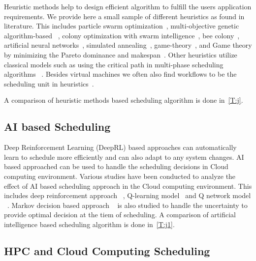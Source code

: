 \documentclass[final,5p,times,twocolumn]{elsarticle}
\begin{document}
Heuristic methods help to design efficient algorithm to fulfill the
users application requirements. We provide here a small sample of
different heuristics as found in literature. This includes particle
swarm optimization~\cite{pandey2010particle}, multi-objective genetic
algorithm-based ~\cite{mezmaz2011parallel,gkasior2016metaheuristic},
colony optimization with swarm intelligence~\cite{mateos2013aco}, bee
colony~\cite{ld2013honey}, artificial neural
networks~\cite{kousiouris2011effects}, simulated
annealing~\cite{torabzadeh2010cloud},
game-theory~\cite{gkasior2016metaheuristic}, and Game theory by
minimizing the Pareto dominance and makespan~\cite{su2013cost}.  Other
heuristics utilize classical models such as using the critical path in
multi-phase scheduling algorithms ~\cite
{abrishami2013deadline}. Besides virtual machines we often also find
workflows to be the scheduling unit in
heuristics~\cite{bousselmi2016qos}.

A comparison of heuristic methods based scheduling
algorithm is done in~\ref{T:j}.






\subsection{AI based Scheduling}\label{sec:AI}

\color{red}

Deep Reinforcement Learning (DeepRL) based approaches can
automatically learn to schedule more efficiently and can also adapt to
any system changes. AI based approached can be used to handle the
scheduling decisions in Cloud computing environment. Various studies
have been conducted to analyze the effect of AI based scheduling
approach in the Cloud computing environment. This includes deep
reinforcement approach ~\cite{cheng2018drl,mao2018learning},
Q-learning model~\cite{zhang2017energy} and Q network model
~\cite{wang2019multi}. Markov decision based approach
~\cite{barrett2013applying} is also studied to handle the uncertainty
to provide optimal decision at the tiem of scheduling.  A comparison
of artificial intelligence based scheduling algorithm is done
in~\ref{T:j1}.

\color{black}



\subsection{HPC and Cloud Computing Scheduling}
\label{sec:hpc}
\end{document}
